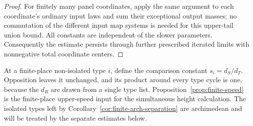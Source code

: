 \begin{proof}
For finitely many panel coordinates, apply the same argument
to each coordinate's ordinary input laws and sum their
exceptional output masses; no commutation of the different
input map systems is needed for this upper-tail union bound.
All constants are independent of the slower parameters.
Consequently the estimate persists through further prescribed
iterated limits with nonnegative total coordinate centers.
\end{proof}

At a finite-place non-isolated type $i$, define the comparison
constant $s_i=d_S/d_T$.  Opposition leaves it unchanged, and
its product around every type cycle is one, because the $d_R$
are drawn from a single type list.  Proposition~\ref{prop:finite-speed}
is the finite-place upper-speed input for the simultaneous height
calculation.  The isolated types left by
Corollary~\ref{cor:finite-arch-separation} are archimedean and
will be treated by the separate estimates below.
